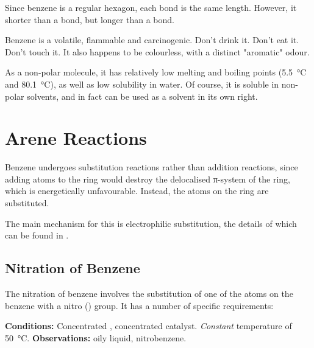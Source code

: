			Since benzene is a regular hexagon, each  bond is the same length. However, it shorter than a  bond, but longer
			than a  bond.

			Benzene is a volatile, flammable and carcinogenic. Don't drink it. Don't eat it. Don't touch it. It also happens to be colourless,
			with a distinct "aromatic" odour.

			As a non-polar molecule, it has relatively low melting and boiling points (\SI{5.5}{\celsius} and \SI{80.1}{\celsius}), as well as low
			solubility in water. Of course, it is soluble in non-polar solvents, and in fact can be used as a solvent in its own right.



	\pagebreak
	\hypertarget{AreneReactions}{}
	\section{Arene Reactions}

		Benzene undergoes substitution reactions rather than addition reactions, since adding atoms to the ring would destroy the
		delocalised π-system of the ring, which is energetically unfavourable. Instead, the  atoms on the ring are substituted.

		The main mechanism for this is electrophilic substitution, the details of which can be found in
		\hyperlink{AppendixElectrophilicSubstitution}{}.


		\subsection{Nitration of Benzene}

			The nitration of benzene involves the substitution of one of the  atoms on the benzene with a nitro () group.
			It has a number of specific requirements:

			\vspace{1.5em}
			\vbox{\textbf{Conditions:}	\tabto{35mm}Concentrated , concentrated  catalyst.
										\tabto{35mm}\textit{Constant} temperature of \SI{50}{\celsius}.}
			\vspace{0.75em}
			\vbox{\textbf{Observations:}\tabto{35mm} oily liquid, nitrobenzene.}



